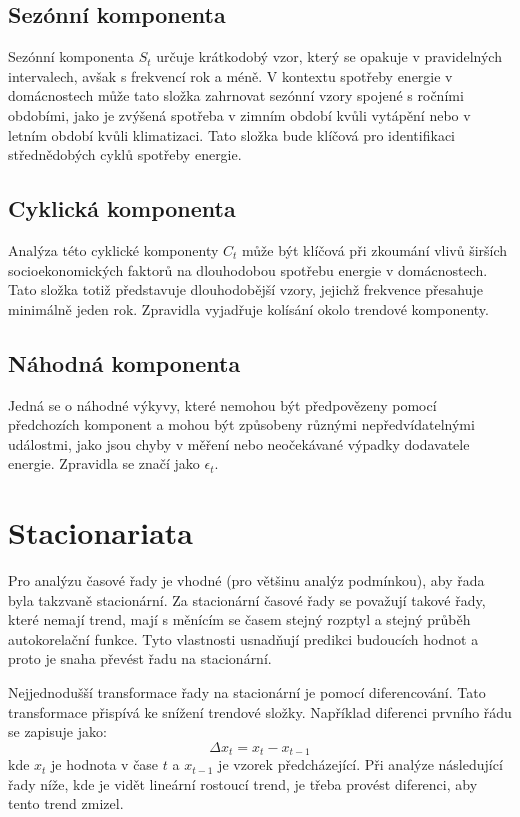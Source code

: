 \documentclass[FM,BP,fonts]{tulthesis}
\begin{document}
\subsection{Sezónní komponenta}
Sezónní komponenta $S_t$ určuje krátkodobý vzor, který se opakuje v pravidelných intervalech, avšak s frekvencí rok a méně. \cite{efjcu-cz} V kontextu spotřeby energie v domácnostech může tato složka zahrnovat sezónní vzory spojené s ročními obdobími, jako je zvýšená spotřeba v zimním období kvůli vytápění nebo v letním období kvůli klimatizaci. Tato složka bude klíčová pro identifikaci střednědobých cyklů spotřeby energie.

\subsection{Cyklická komponenta}
Analýza této cyklické komponenty $C_t$ může být klíčová při zkoumání vlivů širších socioekonomických faktorů na dlouhodobou spotřebu energie v domácnostech. Tato složka totiž představuje dlouhodobější vzory, jejichž frekvence přesahuje minimálně jeden rok. \cite{Brockwell2016-qt} Zpravidla vyjadřuje kolísání okolo trendové komponenty.


\subsection{Náhodná komponenta}
 Jedná se o náhodné výkyvy, které nemohou být předpovězeny pomocí předchozích komponent a mohou být způsobeny různými nepředvídatelnými událostmi, jako jsou chyby v měření nebo neočekávané výpadky dodavatele energie. Zpravidla se značí jako  $\epsilon_t$.
 

\section {Stacionariata}
Pro analýzu časové řady je vhodné (pro většinu analýz podmínkou), aby řada byla takzvaně stacionární. Za stacionární časové řady se považují takové řady, které nemají trend, mají s měnícím se časem stejný rozptyl a stejný průběh autokorelační funkce. \cite{efjcu-cz} Tyto vlastnosti usnadňují predikci budoucích hodnot a proto je snaha převést řadu na stacionární. 

Nejjednodušší transformace řady na stacionární je pomocí diferencování. Tato transformace přispívá ke snížení trendové složky. Například diferenci prvního řádu se zapisuje jako:  
\begin{equation}
 \Delta x_t = x_t - x_{t-1}
\end{equation}
kde $x_t$ je hodnota v čase $t$ a $x_{t-1}$ je vzorek předcházející. Při analýze následující řady níže, kde je vidět lineární rostoucí trend, je třeba provést diferenci, aby tento trend zmizel.
 
\end{document}

